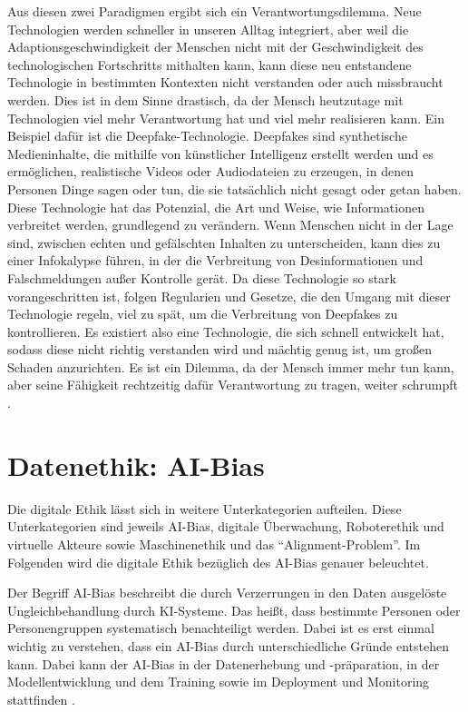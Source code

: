 \documentclass[11pt]{article}
\begin{document}
Aus diesen zwei Paradigmen ergibt sich ein Verantwortungsdilemma. Neue Technologien werden schneller in unseren Alltag integriert, aber weil die Adaptionsgeschwindigkeit der Menschen nicht mit der Geschwindigkeit des technologischen Fortschritts mithalten kann, kann diese neu entstandene Technologie in bestimmten Kontexten nicht verstanden oder auch missbraucht werden. Dies ist in dem Sinne drastisch, da der Mensch heutzutage mit Technologien viel mehr Verantwortung hat und viel mehr realisieren kann. Ein Beispiel dafür ist die Deepfake-Technologie. Deepfakes sind synthetische Medieninhalte, die mithilfe von künstlicher Intelligenz erstellt werden und es ermöglichen, realistische Videos oder Audiodateien zu erzeugen, in denen Personen Dinge sagen oder tun, die sie tatsächlich nicht gesagt oder getan haben. Diese Technologie hat das Potenzial, die Art und Weise, wie Informationen verbreitet werden, grundlegend zu verändern. Wenn Menschen nicht in der Lage sind, zwischen echten und gefälschten Inhalten zu unterscheiden, kann dies zu einer Infokalypse führen, in der die Verbreitung von Desinformationen und Falschmeldungen außer Kontrolle gerät. Da diese Technologie so stark vorangeschritten ist, folgen Regularien und Gesetze, die den Umgang mit dieser Technologie regeln, viel zu spät, um die Verbreitung von Deepfakes zu kontrollieren. Es existiert also eine Technologie, die sich schnell entwickelt hat, sodass diese nicht richtig verstanden wird und mächtig genug ist, um großen Schaden anzurichten. Es ist ein Dilemma, da der Mensch immer mehr tun kann, aber seine Fähigkeit rechtzeitig dafür Verantwortung zu tragen, weiter schrumpft \cite{article}.

\section{Datenethik: AI-Bias}

Die digitale Ethik lässt sich in weitere Unterkategorien aufteilen. Diese Unterkategorien sind jeweils AI-Bias, digitale Überwachung, Roboterethik und virtuelle Akteure sowie Maschinenethik und das \enquote{Alignment-Problem}. Im Folgenden wird die digitale Ethik bezüglich des AI-Bias genauer beleuchtet.

Der Begriff AI-Bias beschreibt die durch Verzerrungen in den Daten ausgelöste Ungleichbehandlung durch KI-Systeme. Das heißt, dass bestimmte Personen oder Personengruppen systematisch benachteiligt werden. Dabei ist es erst einmal wichtig zu verstehen, dass ein AI-Bias durch unterschiedliche Gründe entstehen kann. Dabei kann der AI-Bias in der Datenerhebung und -präparation, in der Modellentwicklung und dem Training sowie im Deployment und Monitoring stattfinden \cite{Bias}.
\end{document}
